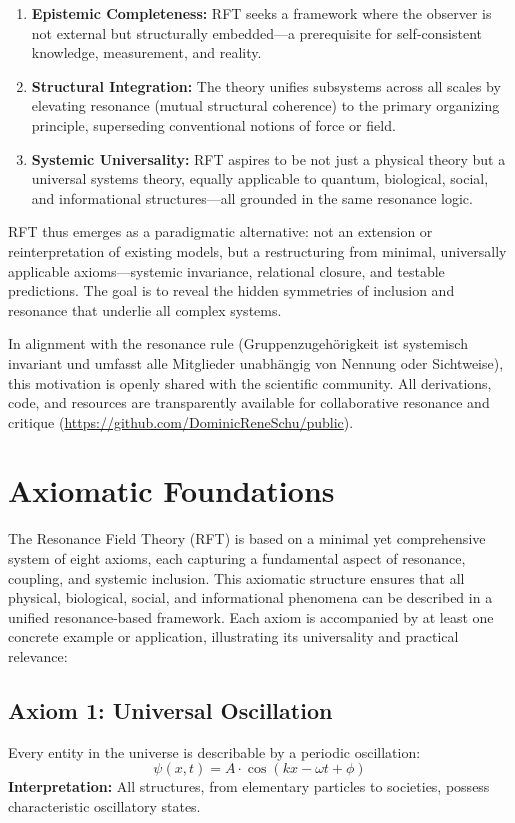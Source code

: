 \documentclass[12pt]{article}
\begin{document}
	\begin{enumerate}
		\item \textbf{Epistemic Completeness:} RFT seeks a framework where the observer is not external but structurally embedded—a prerequisite for self-consistent knowledge, measurement, and reality.
		\item \textbf{Structural Integration:} The theory unifies subsystems across all scales by elevating resonance (mutual structural coherence) to the primary organizing principle, superseding conventional notions of force or field.
		\item \textbf{Systemic Universality:} RFT aspires to be not just a physical theory but a universal systems theory, equally applicable to quantum, biological, social, and informational structures—all grounded in the same resonance logic.
	\end{enumerate}
	
	RFT thus emerges as a paradigmatic alternative: not an extension or reinterpretation of existing models, but a restructuring from minimal, universally applicable axioms—systemic invariance, relational closure, and testable predictions. The goal is to reveal the hidden symmetries of inclusion and resonance that underlie all complex systems.
	
	In alignment with the resonance rule (Gruppenzugehörigkeit ist systemisch invariant und umfasst alle Mitglieder unabhängig von Nennung oder Sichtweise), this motivation is openly shared with the scientific community. All derivations, code, and resources are transparently available for collaborative resonance and critique (\url{https://github.com/DominicReneSchu/public}).
	

	
	\section{Axiomatic Foundations}
	
	The Resonance Field Theory (RFT) is based on a minimal yet comprehensive system of eight axioms, each capturing a fundamental aspect of resonance, coupling, and systemic inclusion. This axiomatic structure ensures that all physical, biological, social, and informational phenomena can be described in a unified resonance-based framework. Each axiom is accompanied by at least one concrete example or application, illustrating its universality and practical relevance:
	
	\subsection{Axiom 1: Universal Oscillation}
	Every entity in the universe is describable by a periodic oscillation:
	\[
	\psi(x, t) = A \cdot \cos(kx - \omega t + \phi)
	\]
	\textbf{Interpretation:} All structures, from elementary particles to societies, possess characteristic oscillatory states.
	
\end{document}
